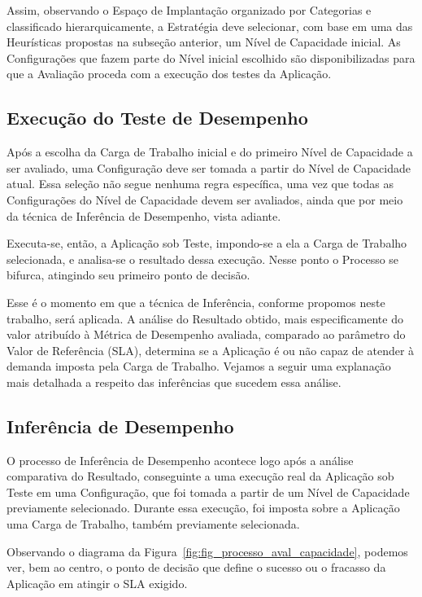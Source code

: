 Assim, observando o Espaço de Implantação organizado por Categorias e classificado
hierarquicamente, a Estratégia deve selecionar, com base em uma das Heurísticas 
propostas na subseção anterior, um Nível de Capacidade inicial. As 
Configurações que fazem parte do Nível inicial escolhido são disponibilizadas 
para que a Avaliação proceda com a execução dos testes da Aplicação.

\subsection{Execução do Teste de Desempenho}
\label{subsec:processo_execucao}
Após a escolha da Carga de Trabalho inicial e do primeiro Nível de Capacidade a
ser avaliado, uma Configuração deve ser tomada a partir do Nível de Capacidade 
atual. Essa seleção não segue nenhuma regra específica, uma vez que todas as 
Configurações do Nível de Capacidade devem ser avaliados, ainda que por meio da técnica de 
Inferência de Desempenho, vista adiante.
 
Executa-se, então, a Aplicação sob Teste, impondo-se a ela a Carga de Trabalho 
selecionada, e analisa-se o resultado dessa execução. Nesse ponto o Processo se 
bifurca, atingindo seu primeiro ponto de decisão.

Esse é o momento em que a técnica de Inferência, conforme propomos neste trabalho,
será aplicada. A análise do Resultado obtido, mais especificamente do valor atribuído
à Métrica de Desempenho avaliada, comparado ao parâmetro do Valor de Referência (SLA), 
determina se a Aplicação é ou não capaz de atender à demanda imposta pela
Carga de Trabalho. Vejamos a seguir uma explanação mais detalhada a respeito das
inferências que sucedem essa análise.  

\subsection{Inferência de Desempenho}
O processo de Inferência de Desempenho acontece logo após a análise comparativa
do Resultado, conseguinte a uma execução real da Aplicação sob Teste em uma 
Configuração, que foi tomada a partir de um Nível de Capacidade previamente 
selecionado. Durante essa execução, foi imposta sobre a Aplicação uma Carga de 
Trabalho, também previamente selecionada.

Observando o diagrama da Figura~\ref{fig:fig_processo_aval_capacidade}, podemos 
ver, bem ao centro, o ponto de decisão que define o sucesso ou o fracasso da 
Aplicação em atingir o SLA exigido. 

